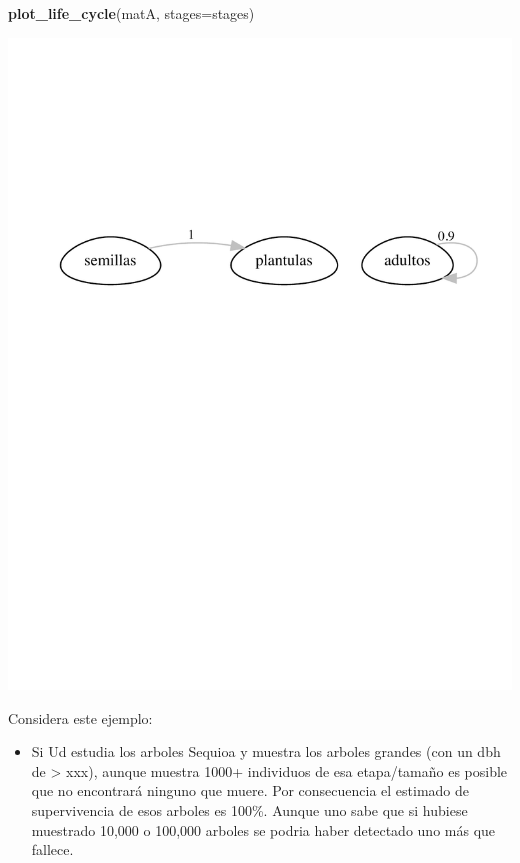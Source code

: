 \documentclass[
]{book}
\newenvironment{Shaded}{\begin{snugshade}}{\end{snugshade}}
\newcommand{\AttributeTok}[1]{\textcolor[rgb]{0.13,0.29,0.53}{#1}}
\newcommand{\FunctionTok}[1]{\textcolor[rgb]{0.13,0.29,0.53}{\textbf{#1}}}
\newcommand{\NormalTok}[1]{#1}
\providecommand{\tightlist}{%
  \setlength{\itemsep}{0pt}\setlength{\parskip}{0pt}}
\theoremstyle{definition}
\theoremstyle{definition}
\theoremstyle{definition}
\theoremstyle{definition}
\theoremstyle{remark}
\begin{document}
\begin{Shaded}
\begin{Highlighting}[]
\FunctionTok{plot\_life\_cycle}\NormalTok{(matA, }\AttributeTok{stages=}\NormalTok{stages)}
\end{Highlighting}
\end{Shaded}

\includegraphics{Diagnostico_Poblacional_files/figure-latex/chap7_2-1.pdf}

Considera este ejemplo:

\begin{itemize}
\tightlist
\item
  Si Ud estudia los arboles Sequioa y muestra los arboles grandes (con un dbh de \textgreater{} xxx), aunque muestra 1000+ individuos de esa etapa/tamaño es posible que no encontrará ninguno que muere. Por consecuencia el estimado de supervivencia de esos arboles es 100\%. Aunque uno sabe que si hubiese muestrado 10,000 o 100,000 arboles se podria haber detectado uno más que fallece.
\end{itemize}
\end{document}
